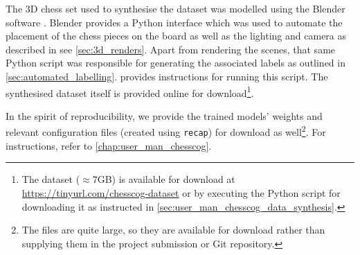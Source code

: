 \documentclass[../main.tex]{subfiles}
\begin{document}
The 3D chess set used to synthesise the dataset was modelled using the Blender software \cite{blender}.
Blender provides a Python interface which was used to automate the placement of the chess pieces on the board as well as the lighting and camera as described in see \cref{sec:3d_renders}.
Apart from rendering the scenes, that same Python script was responsible for generating the associated labels as outlined in \cref{sec:automated_labelling}.
 provides instructions for running this script.
The synthesised dataset itself is provided online for download\footnote{The dataset ($\approx$7GB) is available for download at \url{https://tinyurl.com/chesscog-dataset} or by executing the Python script for downloading it as instructed in \cref{sec:user_man_chesscog_data_synthesis}.}.

In the spirit of reproducibility, we provide the trained models' weights and relevant configuration files (created using \texttt{recap}) for download as well\footnote{The files are quite large, so they are available for download rather than supplying them in the project submission or Git repository.}.
For instructions, refer to \cref{chap:user_man_chesscog}.
\end{document}
